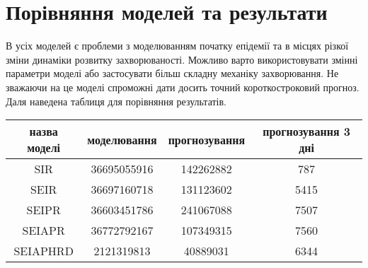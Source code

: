 \section{Порівняння моделей та результати}


В усіх моделей є проблеми з моделюванням початку епідемії та в місцях 
різкої зміни динаміки розвитку захворюваності. Можливо варто 
використовувати змінні параметри моделі або застосувати більш складну 
механіку захворювання. 
Не зважаючи на це моделі спроможні дати досить точний 
короткостроковий прогноз. 
Даля наведена таблиця для порівняння результатів. 

\begin{center}
    \begin{tabular}{||c c c c||} 
        \hline
        назва моделі & моделювання & 
        прогнозування & прогнозування 3 дні \\ [0.1ex] 
        \hline\hline
        SIR & 36695055916 & 142262882 & 787 \\ 
        \hline
        SEIR &  36697160718 & 131123602 & 5415 \\
        \hline
        SEIPR &  36603451786 & 241067088 & 7507 \\
        \hline
        SEIAPR &  36772792167 & 107349315 & 7560 \\
        \hline
        SEIAPHRD & 2121319813 & 40889031 & 6344 \\ [1ex] 
        \hline
    \end{tabular}
\end{center}